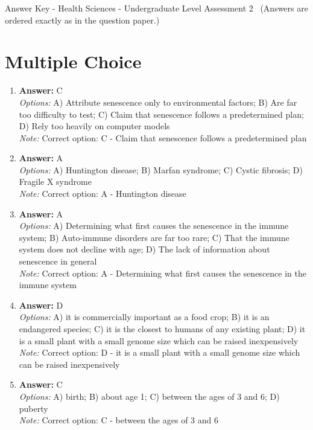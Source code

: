 \documentclass[12pt]{article}
\begin{document}
\begin{center}
Answer Key - Health Sciences - Undergraduate Level Assessment 2 \
\small (Answers are ordered exactly as in the question paper.)
\end{center}

\section*{Multiple Choice}
\begin{enumerate}[label=\arabic*.]
\item \textbf{Answer:} C
\\ \textit{Options:} A) Attribute senescence only to environmental factors; B) Are far too difficulty to test; C) Claim that senescence follows a predetermined plan; D) Rely too heavily on computer models
\\ \textit{Note:} Correct option: C - Claim that senescence follows a predetermined plan
\item \textbf{Answer:} A
\\ \textit{Options:} A) Huntington disease; B) Marfan syndrome; C) Cystic fibrosis; D) Fragile X syndrome
\\ \textit{Note:} Correct option: A - Huntington disease
\item \textbf{Answer:} A
\\ \textit{Options:} A) Determining what first causes the senescence in the immune system; B) Auto-immune disorders are far too rare; C) That the immune system does not decline with age; D) The lack of information about senescence in general
\\ \textit{Note:} Correct option: A - Determining what first causes the senescence in the immune system
\item \textbf{Answer:} D
\\ \textit{Options:} A) it is commercially important as a food crop; B) it is an endangered species; C) it is the closest to humans of any existing plant; D) it is a small plant with a small genome size which can be raised inexpensively
\\ \textit{Note:} Correct option: D - it is a small plant with a small genome size which can be raised inexpensively
\item \textbf{Answer:} C
\\ \textit{Options:} A) birth; B) about age 1; C) between the ages of 3 and 6; D) puberty
\\ \textit{Note:} Correct option: C - between the ages of 3 and 6
\end{enumerate}
\end{document}
